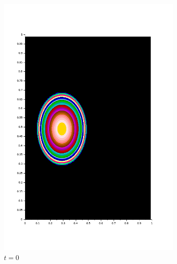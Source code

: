 \documentclass{article}
\begin{document}
\begin{figure}
	\centering
	\begin{subfigure}[b]{0.4\textwidth}
		\includegraphics[width=\textwidth]{conv-2D_kappa_0,01_i.png}
		\caption{$t=0$}
	\end{subfigure}
	\begin{subfigure}[b]{0.4\textwidth}

\end{subfigure}
\end{figure}
\end{document}
